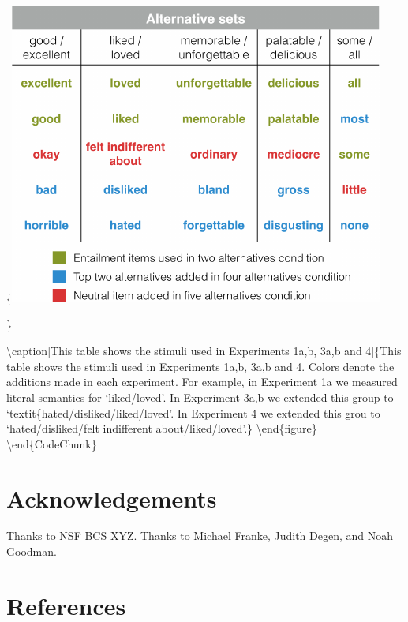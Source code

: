 \documentclass[10pt, letterpaper]{article}
\begin{document}
\{\centering \includegraphics{figs/allScalesTable-1}

\}

\textbackslash{}caption{[}This table shows the stimuli used in
Experiments 1a,b, 3a,b and 4{]}\{This table shows the stimuli used in
Experiments 1a,b, 3a,b and 4. Colors denote the additions made in each
experiment. For example, in Experiment 1a we measured literal semantics
for `liked/loved'. In Experiment 3a,b we extended this group to
`textit\{hated/disliked/liked/loved'. In Experiment 4 we extended this
grou to `hated/disliked/felt indifferent
about/liked/loved'.\}\label{fig:allScalesTable}
\textbackslash{}end\{figure\} \textbackslash{}end\{CodeChunk\}

\section{Acknowledgements}\label{acknowledgements}

Thanks to NSF BCS XYZ. Thanks to Michael Franke, Judith Degen, and Noah
Goodman.

\section{References}\label{references}

\setlength{\parindent}{-0.1in} \setlength{\leftskip}{0.125in} \noindent
\end{document}
